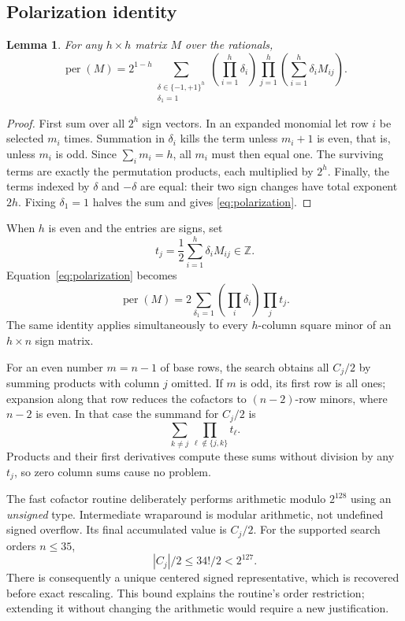 \documentclass[11pt,a4paper]{article}
\newtheorem{lemma}[theorem]{Lemma}
\theoremstyle{remark}\newtheorem{remark}[theorem]{Remark}
\DeclareMathOperator{\per}{per}
\begin{document}
\subsection{Polarization identity}
\begin{lemma}\label{lem:polarization}
For any $h\times h$ matrix $M$ over the rationals,
\begin{equation}\label{eq:polarization}
 \per(M)=2^{1-h}\!\sum_{\substack{\delta\in\{-1,+1\}^h\\\delta_1=1}}
 \left(\prod_{i=1}^h\delta_i\right)
 \prod_{j=1}^h\left(\sum_{i=1}^h\delta_iM_{ij}\right).
\end{equation}
\end{lemma}
\begin{proof}
First sum over all $2^h$ sign vectors. In an expanded monomial let row $i$ be selected $m_i$ times. Summation in $\delta_i$ kills the term unless $m_i+1$ is even, that is, unless $m_i$ is odd. Since $\sum_i m_i=h$, all $m_i$ must then equal one. The surviving terms are exactly the permutation products, each multiplied by $2^h$. Finally, the terms indexed by $\delta$ and $-\delta$ are equal: their two sign changes have total exponent $2h$. Fixing $\delta_1=1$ halves the sum and gives \eqref{eq:polarization}.
\end{proof}

When $h$ is even and the entries are signs, set
\[
 t_j=\frac12\sum_{i=1}^h\delta_iM_{ij}\in\mathbb Z.
\]
Equation~\eqref{eq:polarization} becomes
\begin{equation}\label{eq:half}
 \per(M)=2\sum_{\delta_1=1}\left(\prod_i\delta_i\right)\prod_j t_j.
\end{equation}
The same identity applies simultaneously to every $h$-column square minor of an $h\times n$ sign matrix.

For an even number $m=n-1$ of base rows, the search obtains all $C_j/2$ by summing products with column $j$ omitted. If $m$ is odd, its first row is all ones; expansion along that row reduces the cofactors to $(n-2)$-row minors, where $n-2$ is even. In that case the summand for $C_j/2$ is
\[
 \sum_{k\ne j}\prod_{\ell\notin\{j,k\}}t_\ell.
\]
Products and their first derivatives compute these sums without division by any $t_j$, so zero column sums cause no problem.

The fast cofactor routine deliberately performs arithmetic modulo $2^{128}$ using an \emph{unsigned} type. Intermediate wraparound is modular arithmetic, not undefined signed overflow. Its final accumulated value is $C_j/2$. For the supported search orders $n\leq35$,
\[
 |C_j|/2\leq34!/2<2^{127}.
\]
There is consequently a unique centered signed representative, which is recovered before exact rescaling. This bound explains the routine's order restriction; extending it without changing the arithmetic would require a new justification.
\end{document}
